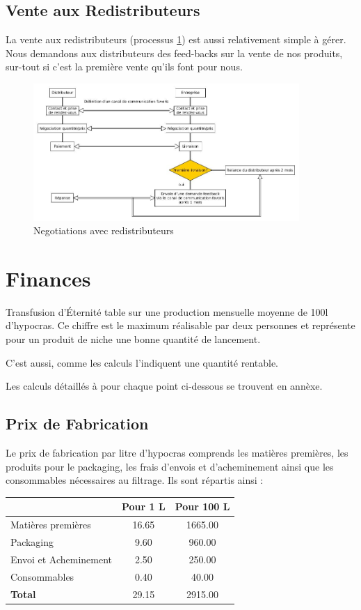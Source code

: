 \documentclass[10pt,a4paper]{article}
\newcommand{\tde}{Transfusion d'Éternité}
\begin{document}
\subsection{Vente aux Redistributeurs}
La vente aux redistributeurs (processus \ref{redist}) est aussi relativement simple à gérer.
Nous demandons aux distributeurs des feed-backs sur la vente de nos produits, sur-tout si c'est la première vente qu'ils font pour nous.

\begin{figure}[h!]
\centering
\includegraphics[width=0.9\textwidth]{../flowchart/distributeur.jpg}
\caption{Negotiations avec redistributeurs}
\label{redist}
\end{figure}

\clearpage
\section{Finances}
\tde{} table sur une production mensuelle moyenne de 100l d'hypocras.
Ce chiffre est le maximum réalisable par deux personnes et représente pour un produit de niche une bonne quantité de lancement.

C'est aussi, comme les calculs l'indiquent une quantité rentable.

Les calculs détaillés à pour chaque point ci-dessous se trouvent en annèxe.

\subsection{Prix de Fabrication}
Le prix de fabrication par litre d'hypocras comprends les matières premières, les produits pour le packaging, les frais d'envois et d'acheminement ainsi que les consommables nécessaires au filtrage.
Ils sont répartis ainsi :

\vspace{0.5cm}
\begin{tabular}{|l|S[table-format=4.2]|S[table-format=4.2]|}
\hline
& \textbf{Pour 1 L} & \textbf{Pour 100 L} \\\hline
Matières premières & 16.65 & 1665.00\\ 
Packaging & 9.60 & 960.00\\ 
Envoi et Acheminement & 2.50 & 250.00 \\
Consommables & 0.40 & 40.00\\\hline
\textbf{Total} & 29.15 & 2915.00\\\hline
\end{tabular}
\end{document}

